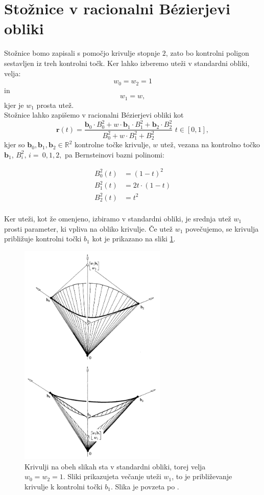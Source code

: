 \documentclass[a4paper,11pt]{article}
\theoremstyle{definition}
\theoremstyle{plain}
\begin{document}

\section{Stožnice v racionalni B\'ezierjevi obliki}
Stožnice bomo zapisali s pomočjo krivulje stopnje $2$, zato bo kontrolni poligon sestavljen iz treh kontrolni točk. Ker lahko izberemo uteži v standardni obliki, velja: 
$$w_0=w_2=1 $$
in
$$ w_1=w,$$
kjer je $w_1$ prosta utež.
\\
Stožnice lahko zapišemo v racionalni B\'ezierjevi obliki kot 
$$\boldsymbol{r}(t)=\frac{\boldsymbol{b}_0\cdot B_0^2+w\cdot\boldsymbol{b}_1\cdot B_1^2+\boldsymbol{b}_2\cdot B_2^2}{ B_0^2+w\cdot B_1^2+ B_2^2}\,\, t\in[0,1],$$
kjer so $\boldsymbol{b}_0, \boldsymbol{b}_1, \boldsymbol{b}_2 \in \mathbb{R}^2$ kontrolne točke krivulje, $w$ utež, vezana na kontrolno točko $\boldsymbol{b}_1$, $B_i^2,\,i=~0,1,2,$ pa Bernsteinovi bazni polinomi:

\begin{align*}
B_0^2(t) &= (1-t)^2 \\
B_1^2(t) &= 2t\cdot(1-t) \\
B_2^2(t) &= t^2 \\
\end{align*}

Ker uteži, kot že omenjeno, izbiramo v standardni obliki, je srednja utež $w_1$ prosti parameter, ki vpliva na obliko krivulje. Če utež $w_1$ povečujemo, se krivulja približuje kontrolni točki $b_1$ kot je prikazano na sliki \ref{slika:w1}.

\begin{figure}[ht!]\label{slika:w1}
    \centering
    \includegraphics[width=70mm]{vecanje_w1.png}
    \caption{Krivulji na obeh slikah sta v standardni obliki, torej velja $w_0 = w_2 = 1$. Sliki prikazujeta večanje uteži $w_1$, to je približevanje krivulje k kontrolni točki $b_1$. Slika je povzeta po \cite{farin}.}
\end{figure}
\end{document}
